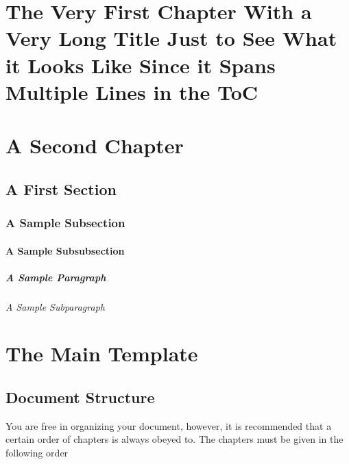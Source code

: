 \chapter[The Short Title of the Chapter Showing Up in the TOC and the Page Headers]{The Very First Chapter With a Very Long Title Just to See What it Looks Like Since it Spans Multiple Lines in the ToC}


\lipsum[1]

\chapter{A Second Chapter}

\lipsum[1]

\section{A First Section}

\lipsum[1]

\subsection{A Sample Subsection}

\lipsum[1]

\subsubsection{A Sample Subsubsection}

\lipsum[1]

\paragraph{A Sample Paragraph}
\lipsum[1]

\subparagraph{A Sample Subparagraph}
\lipsum[1]


\chapter{The Main Template}

\section{Document Structure}

You are free in organizing your document, however, it is recommended that a certain order of chapters is always obeyed to. The chapters must be given in the following order

